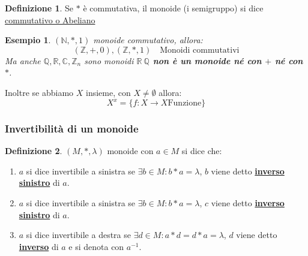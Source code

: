 \documentclass{article}
\newtheorem{exmp}{Esempio}[section]
\theoremstyle{definition}
\newtheorem{definition}{Definizione}[section]
\begin{document}
\begin{definition}
        Se $ * $ è commutativa, il monoide (i semigruppo) si dice \underline{commutativo o Abeliano}
\end{definition}
\begin{exmp}
        $  (\mathbb{N}, *, 1)$  monoide commutativo, allora:
        \begin{equation*}
                (\mathbb{Z}, +, 0), (\mathbb{Z}, *, 1) \quad  \mbox{Monoidi commutativi}
        \end{equation*}
        Ma anche $ \mathbb{Q},\mathbb{R}, \mathbb{C}, \mathbb{Z}_n  $ sono monoidi\newline
\textbf{$\mathbb{R} \ \mathbb{Q}$ non è un monoide né con $ + $ né con $ * $}.
\end{exmp}


Inoltre se abbiamo $X$ insieme, con $X \not = \emptyset$ allora:
\begin{equation*}
        X^x = \{f : X \to X \mbox{Funzione}\}
\end{equation*}


\subsubsection{Invertibilità di un monoide}\label{sec:invertibilità_di_un_monoide}
\begin{definition}
        $ (M, *, \lambda) $ monoide con $ a \in M $ si dice che:
        \begin{enumerate}
                \item $a$ si dice invertibile a sinistra se $ \exists b \in M : b*a = \lambda $, $b$ viene detto \textbf{\underline{inverso sinistro}} di $a$. 
                \item $a$ si dice invertibile a sinistra se $ \exists b \in M : b*a = \lambda $, $c$ viene detto \textbf{\underline{inverso sinistro}} di $a$. 
                \item $a$ si dice invertibile a destra se $ \exists d \in M : a*d = d*a = \lambda $, $d$ viene detto \textbf{\underline{inverso}} di $a$ e si denota con $a^{-1}$. 
        \end{enumerate}
\end{definition}
\end{document}

